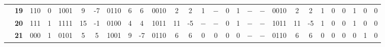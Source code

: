 \begin{figure}[H]
\begin{tcolorbox}[left=5mm,right=5mm,top=0mm,bottom=5mm,boxsep=0mm,
toptitle=0.5mm,bottomtitle=0.5mm,title=Resultados Teóricos \textit{versus} Resultados Experimentais,center title]
\begin{minipage}{\textwidth}
{\begin{tabular}{c|c|c|c|c|c|c|c|c|c|c|c|c|c|c|c|c|c|c|c|c|c|c|c|c|c|c|c|}
\cline{2-28}
                                                                                                           & \textbf{19}          & 110                  & 0                    & 1001                 & 9                                           & -7                                          & 0110                 & 6                                           & 6                                           & 0010                 & 2                                           & 2                                           & 1                    & $-$                    & 0                    & 1                    & $-$                    & $-$                    & 0010                 & 2                                           & 2                                           & 1                    & 0                    & 0                    & 1                    & 0                    & 0                     \\ 
\cline{2-28}
                                                                                                           & \textbf{20}          & 111                  & 1                    & 1111                 & 15                                          & -1                                          & 0100                 & 4                                           & 4                                           & 1011                 & 11                                          & -5                                          & $-$                    & $-$                    & 0                    & 1                    & $-$                    & $-$                    & 1011                 & 11                                          & -5                                          & 1                    & 0                    & 0                    & 1                    & 0                    & 0                     \\ 
\hline
\rowcolor[rgb]{1,1,0} \multicolumn{1}{|c|}{{\cellcolor[rgb]{0.596,0.796,0.996}}\textbf{Aritm}} & \textbf{21}          & 000                  & 1                    & 0101                 & 5                                           & 5                                           & 1001                 & 9                                           & -7                                          & 0110                 & 6                                           & 6                                           & 0                    & 0                    & 0                    & 0                    & $-$                    & $-$                    & 0110                 & 6                                           & 6                                           & 0                    & 0                    & 0                    & 0                    & 1                    & 0                     \\ 

\end{tabular}}
\end{minipage}
\end{tcolorbox}
\end{figure}
